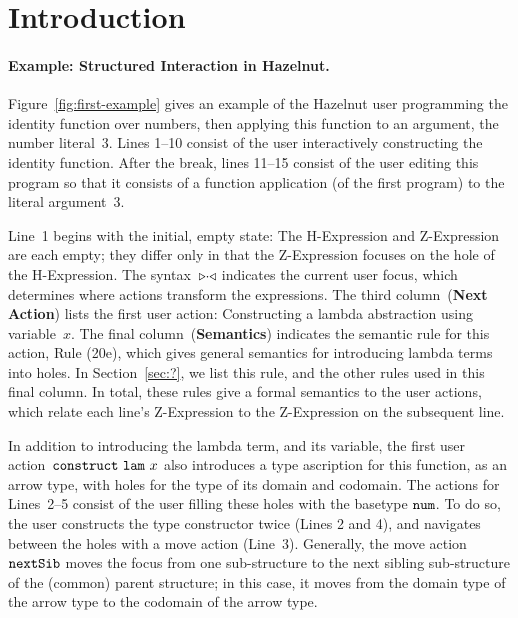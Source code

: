\documentclass{llncs}
\begin{document}
\section{Introduction}
%


\paragraph{Example: Structured Interaction in Hazelnut.}
%
Figure~\ref{fig:first-example} gives an example of the Hazelnut user
programming the identity function over numbers, then applying this
function to an argument, the number literal~3.
%
Lines 1--10 consist of the user interactively constructing the
identity function.
%
After the break, lines 11--15 consist of the user editing this program
so that it consists of a function application (of the first program)
to the literal argument~3.

Line~1 begins with the initial, empty state: The H-Expression and
Z-Expression are each empty; they differ only in that the Z-Expression
focuses on the hole of the H-Expression.
%
The syntax~${\triangleright}{\cdot}{\triangleleft}$ indicates the current user focus, which
determines where actions transform the expressions.
%
The third column~(\textbf{Next Action}) lists the first user action:
Constructing a lambda abstraction using variable~$x$.
%
The final column~(\textbf{Semantics}) indicates the semantic rule for
this action, Rule (20e), which gives general semantics for introducing
lambda terms into holes.
%
In Section~\ref{sec:?}, we list this rule, and the other rules used in
this final column. In total, these rules give a formal semantics to
the user actions, which relate each line's Z-Expression to the
Z-Expression on the subsequent line.

In addition to introducing the lambda term, and its variable, the
first user action~$\mathtt{construct}~\mathtt{lam}~x$ also introduces a type
ascription for this function, as an arrow type, with holes for the
type of its domain and codomain.
%
The actions for Lines~2--5 consist of the user filling these holes
with the basetype $\texttt{num}{}$.
%
To do so, the user constructs the type constructor twice (Lines 2 and
4), and navigates between the holes with a move action (Line~3).
%
Generally, the move action~$\mathtt{nextSib}$ moves the focus from one
sub-structure to the next sibling sub-structure of the (common) parent
structure; in this case, it moves from the domain type of the arrow
type to the codomain of the arrow type.
%
\end{document}
